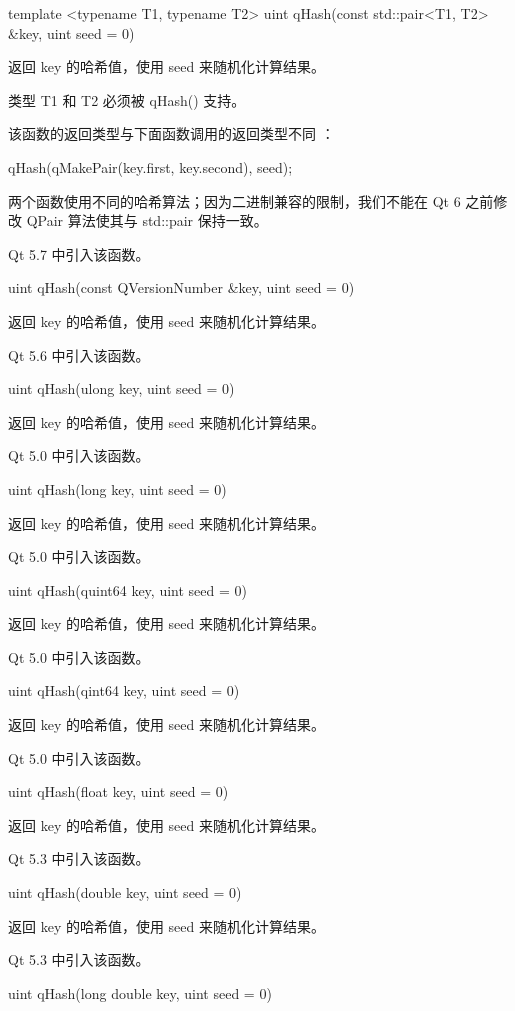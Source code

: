 template <typename T1, typename T2> uint qHash(const std::pair<T1, T2> \&key, uint seed = 0)

返回 key 的哈希值，使用 seed 来随机化计算结果。

类型 T1 和 T2 必须被 qHash() 支持。

\begin{notice}
该函数的返回类型与下面函数调用的返回类型不同 ：
\end{notice}

\begin{cppcode}
qHash(qMakePair(key.first, key.second), seed);
\end{cppcode}

两个函数使用不同的哈希算法；因为二进制兼容的限制，我们不能在 Qt 6 之前修改 QPair 算法使其与 std::pair 保持一致。

Qt 5.7 中引入该函数。

uint qHash(const QVersionNumber \&key, uint seed = 0)

返回 key 的哈希值，使用 seed 来随机化计算结果。

Qt 5.6 中引入该函数。

uint qHash(ulong key, uint seed = 0)

返回 key 的哈希值，使用 seed 来随机化计算结果。

Qt 5.0 中引入该函数。

uint qHash(long key, uint seed = 0)

返回 key 的哈希值，使用 seed 来随机化计算结果。

Qt 5.0 中引入该函数。

uint qHash(quint64 key, uint seed = 0)

返回 key 的哈希值，使用 seed 来随机化计算结果。

Qt 5.0 中引入该函数。

uint qHash(qint64 key, uint seed = 0)

返回 key 的哈希值，使用 seed 来随机化计算结果。

Qt 5.0 中引入该函数。

uint qHash(float key, uint seed = 0)

返回 key 的哈希值，使用 seed 来随机化计算结果。

Qt 5.3 中引入该函数。

uint qHash(double key, uint seed = 0)

返回 key 的哈希值，使用 seed 来随机化计算结果。

Qt 5.3 中引入该函数。

uint qHash(long double key, uint seed = 0)

